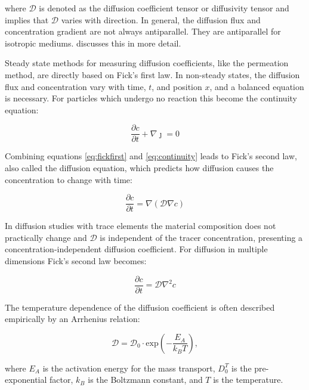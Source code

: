 \documentclass[../main.tex]{subfiles}
\begin{document}
where $\mathcal{D}$ is denoted as the diffusion coefficient tensor or diffusivity tensor and implies that $\mathcal{D}$ varies with direction. In general, the diffusion flux and concentration gradient are not always antiparallel. They are antiparallel for isotropic mediums. \citeauthor{heitjans2006diffusion} discusses this in more detail.\cite{heitjans2006diffusion}

Steady state methods for measuring diffusion coefficients, like the permeation method, are directly based on Fick's first law.\cite{heumann2013diffusion} In non-steady states, the diffusion flux and concentration vary with time, $t$, and position $x$, and a balanced equation is necessary. For particles which undergo no reaction this become the continuity equation:

\begin{equation}
    \frac{\partial c}{\partial t} + \nabla {\boldsymbol{\jmath}} = 0
    \label{eq:continuity}
\end{equation}

Combining equations \ref{eq:fickfirst} and \ref{eq:continuity} leads to Fick's second law, also called the diffusion equation, which predicts how diffusion causes the concentration to change with time:

\begin{equation}
    \label{eq:ficksecond}
    \frac{\partial c}{\partial t} = \nabla (\mathcal{D} \nabla c )
\end{equation}

In diffusion studies with trace elements the material composition does not practically change and $\mathcal{D}$ is independent of the tracer concentration, presenting a concentration-independent diffusion coefficient. For diffusion in multiple dimensions Fick's second law becomes: \cite{crank1979mathematics}

\begin{equation}
    \frac{\partial c}{\partial t} = \mathcal{D} \nabla^2 c
    \label{eq:nodirectional_diffusion}
\end{equation}

The temperature dependence of the diffusion coefficient is often described empirically by an Arrhenius relation:

\begin{equation}
    \mathcal{D} = \mathcal{D}_0 \cdot \textrm{exp} \left (- \frac{E_A}{k_B T} \right ),
\end{equation}

where $E_A$ is the activation energy for the mass transport, $D_0^T$ is the pre-exponential factor, $k_B$ is the Boltzmann constant, and $T$ is the temperature.
\end{document}
